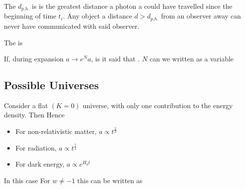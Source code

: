 \documentclass{article}
\begin{document}
\begin{definition}
The  $d_{p.h.}$ is is the greatest distance a photon a could have travelled since the beginning of time $t_i$. Any object a distance $d>d_{p.h.}$ from an observer away can never have communicated with said observer. 
\end{definition}

\begin{definition}
The  is 
\end{definition}

\begin{definition}[e-folds]
If, during expansion $a \to e^N a$, is it said that . $N$ can we written as a variable 
\end{definition}

\subsection{Possible Universes}

\begin{example}
Consider a flat $(K=0)$ universe, with only one contribution to the energy density. Then 
Hence \begin{itemize}
    \item For non-relativistic matter, $a \propto t^{\frac{2}{3}}$
    \item For radiation, $a \propto t^\frac{1}{2}$
    \item For dark energy, $a \propto e^{H_0 t}$
\end{itemize}

In this case 
For $w\neq -1$ this can be written as 
\end{example}
\end{document}
